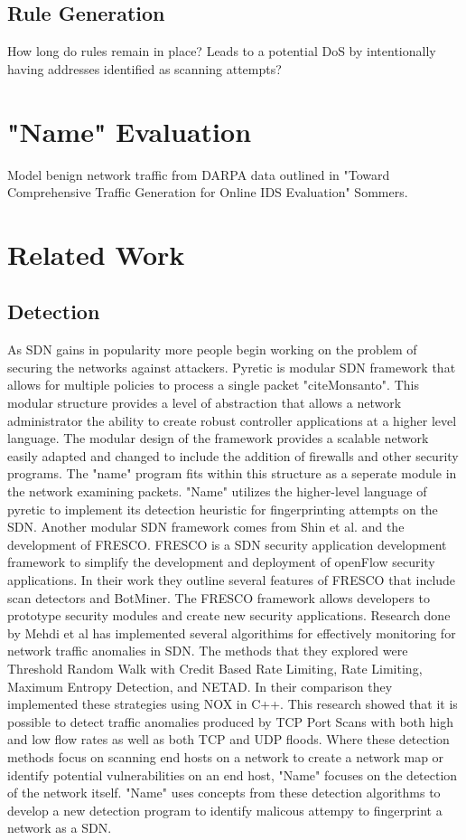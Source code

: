 \documentclass[twocolumn]{article}
\begin{document}
\subsection{Rule Generation}

How long do rules remain in place? Leads to a potential DoS by intentionally having addresses identified as scanning attempts?

\section{"Name" Evaluation}

Model benign network traffic from DARPA data outlined in "Toward Comprehensive Traffic Generation for Online IDS Evaluation" Sommers.


\section{Related Work}

\subsection{Detection}

As SDN gains in popularity more people begin working on the problem of securing the networks against attackers. Pyretic is modular SDN framework that allows for multiple policies to process a single packet "cite{Monsanto}". This modular structure provides a level of abstraction that allows a network administrator the ability to create robust controller applications at a higher level language. The modular design of the framework provides a scalable network easily adapted and changed to include the addition of firewalls and other security programs. The "name" program fits within this structure as a seperate module in the network examining packets. "Name" utilizes the higher-level language of pyretic to implement its detection heuristic for fingerprinting attempts on the SDN.  Another modular SDN framework comes from Shin et al. \cite{FRESCO} and the development of FRESCO. FRESCO is a SDN security application development framework to simplify the development and deployment of openFlow security applications. In their work they outline several features of FRESCO that include scan detectors and BotMiner. The FRESCO framework allows developers to prototype security modules and create new security applications. Research done by Mehdi et al \cite{mehdi13} has implemented several algorithims for effectively monitoring for network traffic anomalies in SDN. The methods that they explored were Threshold Random Walk with Credit Based Rate Limiting, Rate Limiting, Maximum Entropy Detection, and NETAD. In their comparison they implemented these strategies using NOX in C++. This research showed that it is possible to detect traffic anomalies produced by TCP Port Scans with both high and low flow rates as well as both TCP and UDP floods. Where these detection methods focus on scanning end hosts on a network to create a network map or identify potential vulnerabilities on an end host, "Name" focuses on the detection of the network itself. "Name" uses concepts from these detection algorithms to develop a new detection program to identify malicous attempy to fingerprint a network as a SDN.
\end{document}

